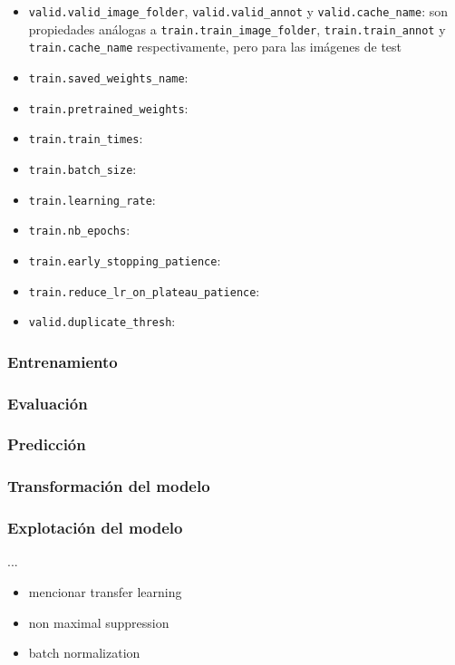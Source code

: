 \begin{itemize}
	\item \texttt{valid.valid\_image\_folder}, \texttt{valid.valid\_annot} y \texttt{valid.cache\_name}: son propiedades análogas a \texttt{train.train\_image\_folder}, \texttt{train.train\_annot} y \texttt{train.cache\_name} respectivamente, pero para las imágenes de test
	
	\item \texttt{train.saved\_weights\_name}:
	\item \texttt{train.pretrained\_weights}:
	\item \texttt{train.train\_times}:
	\item \texttt{train.batch\_size}:
	\item \texttt{train.learning\_rate}:
	\item \texttt{train.nb\_epochs}:
	\item \texttt{train.early\_stopping\_patience}:
	\item \texttt{train.reduce\_lr\_on\_plateau\_patience}:
	\item \texttt{valid.duplicate\_thresh}:
\end{itemize}

\subsubsection*{Entrenamiento}

\subsubsection*{Evaluación}

\subsubsection*{Predicción}

\subsubsection*{Transformación del modelo}

\subsubsection*{Explotación del modelo}

...

\begin{itemize}
	\item mencionar transfer learning
	\item non maximal suppression
	\item batch normalization
\end{itemize}

